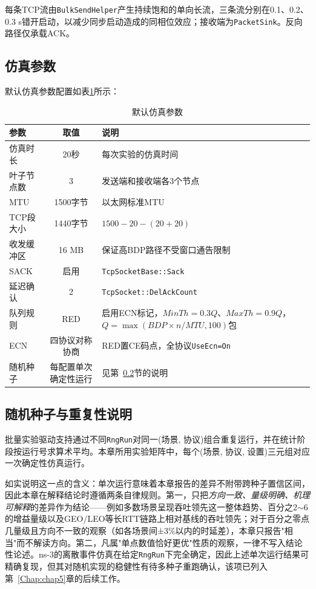 每条TCP流由\texttt{BulkSendHelper}产生持续饱和的单向长流，三条流分别在0.1、0.2、0.3 s错开启动，以减少同步启动造成的同相位效应；接收端为\texttt{PacketSink}。反向路径仅承载ACK。

\subsection{仿真参数}

默认仿真参数配置如表\ref{tab:params}所示：

\begin{table}[htbp]
\centering
\caption{默认仿真参数}
\label{tab:params}
\begin{tabular}{|l|c|l|}
\hline
\textbf{参数} & \textbf{取值} & \textbf{说明} \\
\hline
仿真时长 & 20秒 & 每次实验的仿真时间 \\
叶子节点数 & 3 & 发送端和接收端各3个节点 \\
MTU & 1500字节 & 以太网标准MTU \\
TCP段大小 & 1440字节 & $1500 - 20 - (20+20)$ \\
收发缓冲区 & 16 MB & 保证高BDP路径不受窗口通告限制 \\
SACK & 启用 & \texttt{TcpSocketBase::Sack} \\
延迟确认 & 2 & \texttt{TcpSocket::DelAckCount} \\
队列规则 & RED & 启用ECN标记，$MinTh=0.3Q$、$MaxTh=0.9Q$，$Q=\max(BDP\times n/MTU,100)$包 \\
ECN & 四协议对称协商 & RED置CE码点，全协议\texttt{UseEcn=On} \\
随机种子 & 每配置单次确定性运行 & 见第~\ref{subsec:seed-caveat}节的说明 \\
\hline
\end{tabular}
\end{table}

\subsection{随机种子与重复性说明}
\label{subsec:seed-caveat}

批量实验驱动支持通过不同\texttt{RngRun}对同一(场景, 协议)组合重复运行，并在统计阶段按运行号求算术平均。本章所用实验矩阵中，每个(场景, 协议, 设置)三元组对应一次确定性仿真运行。

如实说明这一点的含义：单次运行意味着本章报告的差异不附带跨种子置信区间，因此本章在解释结论时遵循两条自律规则。第一，只把\emph{方向一致、量级明确、机理可解释}的差异作为结论——例如多数场景呈现吞吐领先这一整体趋势、百分之2$\sim$6的增益量级以及GEO/LEO等长RTT链路上相对基线的吞吐领先；对于百分之零点几量级且方向不一致的观察（如各场景间±3\%以内的时延差），本章只报告"相当"而不解读方向。第二，凡属"单点数值恰好更优"性质的观察，一律不写入结论性论述。ns-3的离散事件仿真在给定\texttt{RngRun}下完全确定，因此上述单次运行结果可精确复现，但其对随机实现的稳健性有待多种子重跑确认，该项已列入第~\ref{Chap:chap5}章的后续工作。

